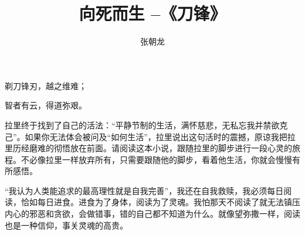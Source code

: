 \documentclass[10pt,a4paper,UTF8]{article}
\author{张朝龙}
\date{}
\title{向死而生 --《刀锋》}
\begin{document}
\maketitle
\tableofcontents
{}
\begin{tikzquote}


剃刀锋刃，越之维难；

智者有云，得道弥艰。
\end{tikzquote}

拉里终于找到了自己的活法：“平静节制的生活，满怀慈悲，无私忘我并禁欲克己”。如果你无法体会被问及“如何生活”，拉里说出这句活时的震撼，原谅我把拉里历经磨难的彻悟放在前面。请阅读这本小说，跟随拉里的脚步进行一段心灵的旅程。不必像拉里一样放弃所有，只需要跟随他的脚步，看着他生活，你就会慢慢有所感悟。

“我认为人类能追求的最高理性就是自我完善”，我还在自我救赎，我必须每日阅读，恰如每日进食。进食为了身体，阅读为了灵魂。我怕那天不阅读了就无法镇压内心的邪恶和贪欲，会做错事，错的自己都不知道为什么。就像望弥撒一样，阅读也是一种信仰，事关灵魂的高贵。
\end{document}
